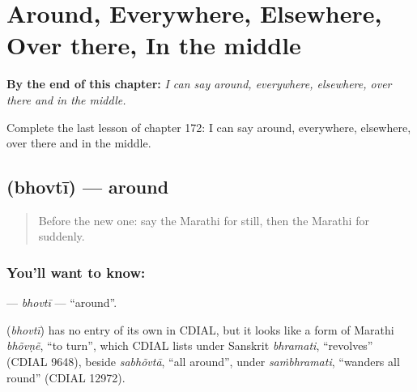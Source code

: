 
\chapter{Around, Everywhere, Elsewhere, Over there, In the middle}
\label{ch:mr-around-everywhere-elsewhere-over-there-in-the-middle}

\begin{chapteropening}
\textbf{By the end of this chapter:} \emph{I can say around, everywhere, elsewhere, over there and in the middle.}

Complete the last lesson of chapter 172: I can say around, everywhere, elsewhere, over there and in the middle.
\end{chapteropening}

\section[\texorpdfstring{\mr{भोवती} (bhovtī)}{भोवती (bhovtī)}]{ (bhovtī) — around}

\label{lesson:MR-C172-bhovti}



\begin{quote}
Before the new one: say the Marathi for still, then the Marathi for suddenly.
\end{quote}

\subsection*{You'll want to know: }
\textbf{} — \emph{bhovtī} — \textquotedblleft{}around\textquotedblright{}.

\begin{cousinweb}
\textbf{} (\emph{bhovtī}) has no entry of its own in CDIAL, but it looks like a form of Marathi \emph{bhõvṇẽ}, \textquotedblleft{}to turn\textquotedblright{}, which CDIAL lists under Sanskrit \emph{bhramati}, \textquotedblleft{}revolves\textquotedblright{} (CDIAL 9648), beside \emph{sabhõvtā}, \textquotedblleft{}all around\textquotedblright{}, under \emph{saṁbhramati}, \textquotedblleft{}wanders all round\textquotedblright{} (CDIAL 12972).
\end{cousinweb}

